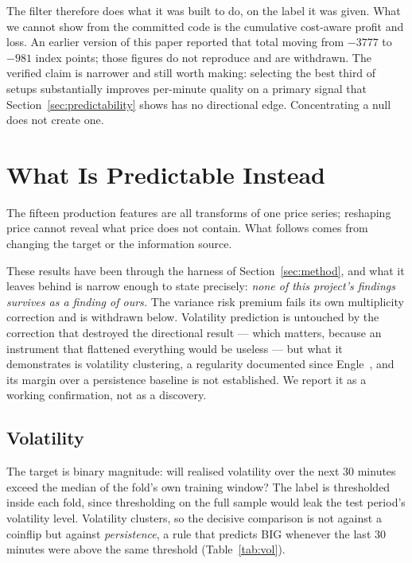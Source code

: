 \documentclass[conference]{IEEEtran}
\begin{document}
The filter therefore does what it was built to do, on the label it was given.
What we cannot show from the committed code is the cumulative cost-aware
profit and loss. An earlier version of this paper reported that total moving
from $-3777$ to $-981$ index points; those figures do not reproduce and are
withdrawn. The verified claim is narrower and still worth making: selecting the
best third of setups substantially improves per-minute quality on a primary
signal that Section~\ref{sec:predictability} shows has no directional edge.
Concentrating a null does not create one.

\section{What Is Predictable Instead}
\label{sec:elsewhere}

The fifteen production features are all transforms of one price series;
reshaping price cannot reveal what price does not contain. What follows comes
from changing the target or the information source.

These results have been through the harness of Section~\ref{sec:method}, and
what it leaves behind is narrow enough to state precisely: \emph{none of this
project's findings survives as a finding of ours.} The variance risk premium
fails its own multiplicity correction and is withdrawn below. Volatility
prediction is untouched by the correction that destroyed the directional
result --- which matters, because an instrument that flattened everything would
be useless --- but what it demonstrates is volatility clustering, a regularity
documented since Engle~\cite{engle1982}, and its margin over a persistence
baseline is not established. We report it as a working confirmation, not as a
discovery.

\subsection{Volatility}

The target is binary magnitude: will realised volatility over the next 30
minutes exceed the median of the fold's own training window? The label is
thresholded inside each fold, since thresholding on the full sample would leak
the test period's volatility level. Volatility clusters, so the decisive
comparison is not against a coinflip but against \emph{persistence}, a rule that
predicts BIG whenever the last 30 minutes were above the same threshold
(Table~\ref{tab:vol}).
\end{document}
